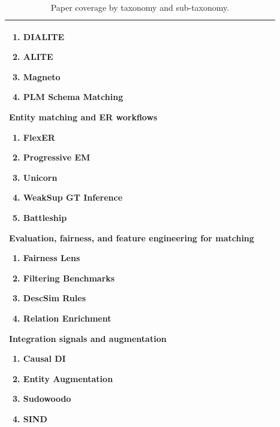 \documentclass[sigconf]{acmart}
\begin{document}
\begin{table}[t]
\begin{tabularx}{\textwidth}{@{}>{\raggedright\arraybackslash}X>{\raggedright\arraybackslash}X>{\raggedright\arraybackslash}X@{}}
\begin{minipage}[t]{\linewidth}
\begin{enumerate}[leftmargin=*,itemsep=1pt,topsep=1pt]
\item DIALITE~\cite{10.1145/3555041.3589732}
\item ALITE~\cite{10.14778/3574245.3574274}
\item Magneto~\cite{10.14778/3742728.3742757}
\item PLM Schema Matching~\cite{10184612}
\end{enumerate}
\textbf{Entity matching and ER workflows}
\begin{enumerate}[leftmargin=*,itemsep=1pt,topsep=1pt]
\item FlexER~\cite{10.1145/3588722}
\item Progressive EM~\cite{10.1145/3709715}
\item Unicorn~\cite{10.1145/3588938}
\item WeakSup GT Inference~\cite{10.1145/3588712}
\item Battleship~\cite{10.1145/3626711}
\end{enumerate}
\textbf{Evaluation, fairness, and feature engineering for matching}
\begin{enumerate}[leftmargin=*,itemsep=1pt,topsep=1pt]
\item Fairness Lens~\cite{10.14778/3611479.3611525}
\item Filtering Benchmarks~\cite{10184692}
\item DescSim Rules~\cite{11112979}
\item Relation Enrichment~\cite{10.14778/3681954.3681987}
\end{enumerate}
\textbf{Integration signals and augmentation}
\begin{enumerate}[leftmargin=*,itemsep=1pt,topsep=1pt]
\item Causal DI~\cite{10.14778/3603581.3603602}
\item Entity Augmentation~\cite{10.14778/3611479.3611535}
\item Sudowoodo~\cite{10184556}
\item SIND~\cite{10.1145/3588929}
\end{enumerate}
\end{minipage}
\\
\bottomrule
\end{tabularx}
\caption{Paper coverage by taxonomy and sub-taxonomy.}
\label{tab:planned-technical-coverage-numbered}
\end{table}
\end{document}
